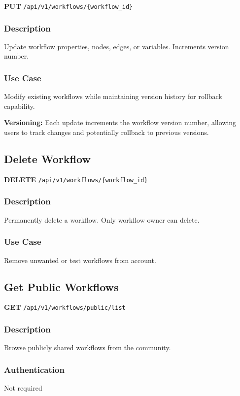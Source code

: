 \documentclass[11pt,a4paper]{report}
\begin{document}
\textbf{PUT} \texttt{/api/v1/workflows/\{workflow\_id\}}

\subsubsection{Description}
Update workflow properties, nodes, edges, or variables. Increments version number.

\subsubsection{Use Case}
Modify existing workflows while maintaining version history for rollback capability.

\begin{infobox}
\textbf{Versioning:}
Each update increments the workflow version number, allowing users to track changes and potentially rollback to previous versions.
\end{infobox}

\subsection{Delete Workflow}

\textbf{DELETE} \texttt{/api/v1/workflows/\{workflow\_id\}}

\subsubsection{Description}
Permanently delete a workflow. Only workflow owner can delete.

\subsubsection{Use Case}
Remove unwanted or test workflows from account.

\subsection{Get Public Workflows}

\textbf{GET} \texttt{/api/v1/workflows/public/list}

\subsubsection{Description}
Browse publicly shared workflows from the community.

\subsubsection{Authentication}
Not required
\end{document}
